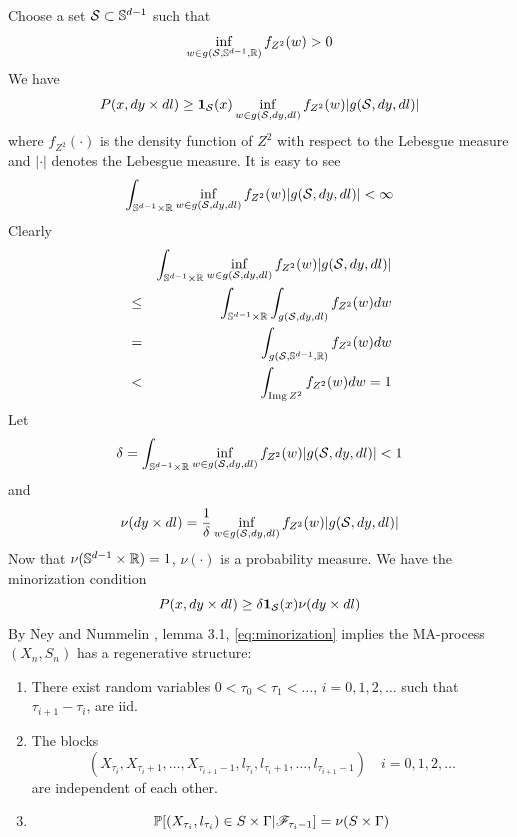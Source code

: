 Choose a set $\mathcal S \subset \sphere^{d-1}$ such that
\[
\inf_{w \in g(\mathcal S, \sphere^{d-1}, \reals)} f_{Z^2}(w) > 0
\]
We have
\begin{eqnarray*}
  P(x, dy \times dl) \geq
  \I_{\mathcal S}(x) \inf_{w \in g(\mathcal S, dy, dl)} f_{Z^2}(w)
  | g(\mathcal S, dy, dl)| 
\end{eqnarray*}
where $f_{Z^2}(\cdot)$ is the density function of $Z^2$ with respect to the
Lebesgue measure and $|\cdot|$ denotes the Lebesgue measure. It is
easy to see
\[
\int_{\sphere^{d-1} \times \reals} \inf_{w \in g(\mathcal S, dy, dl)} f_{Z^2}(w)
| g(\mathcal S, dy, dl)| < \infty
\]
Clearly
\begin{eqnarray*}
  &&
  \int_{\sphere^{d-1} \times \reals} \inf_{w \in g(\mathcal S, dy, dl)} f_{Z^2}(w)
  | g(\mathcal S, dy, dl)| \\
  &\leq&
  \int_{\sphere^{d-1} \times \reals}
  \int_{g(\mathcal S, dy, dl)} f_{Z^2}(w) dw \\
  &=&
  \int_{g(\mathcal S, \sphere^{d-1}, \reals)} f_{Z^2}(w) dw \\
  &<&
  \int_{\img Z^2} f_{Z^2}(w) dw = 1
\end{eqnarray*}
Let
\[
\delta = \int_{\sphere^{d-1} \times \reals}
\inf_{w \in g(\mathcal S, dy, dl)} f_{Z^2}(w)
| g(\mathcal S, dy, dl)| < 1
\]
and
\[
\nu(dy \times dl) = {1 \over \delta}
\inf_{w \in g(\mathcal S, dy, dl)} f_{Z^2}(w)
| g(\mathcal S, dy, dl)|
\]
Now that $\nu(\sphere^{d-1} \times \reals) = 1$, $\nu(\cdot)$ is a
probability measure. We have the minorization condition
\begin{equation}
  \label{eq:minorization}
  P(x, dy \times dl) \geq \delta \I_{\mathcal S}(x) \nu(dy \times dl)
\end{equation}
By Ney and Nummelin \cite{ney:nummelin:1987}, lemma 3.1,
\eqref{eq:minorization} implies the MA-process $(X_n, S_n)$ has a
regenerative structure:
\begin{enumerate}[(1)]
\item There exist random variables $0 < \tau_0 < \tau_1 < \dots$,
  $i = 0, 1, 2, \dots$ such that $\tau_{i+1} - \tau_i$,  are iid.
\item The blocks
  \[
  (X_{\tau_i}, X_{\tau_i + 1}, \dots, X_{\tau_{i+1} - 1}, l_{\tau_i},
  l_{\tau_i + 1}, \dots, l_{\tau_{i+1} - 1}) \quad
  i = 0, 1, 2, \dots
  \]
  are independent of each other.
\item
  \[
  \P[(X_{\tau_i}, l_{\tau_i}) \in S \times \Gamma | \mathscr F_{\tau_i - 1}]
  = \nu(S \times \Gamma)
  \]
\end{enumerate}

